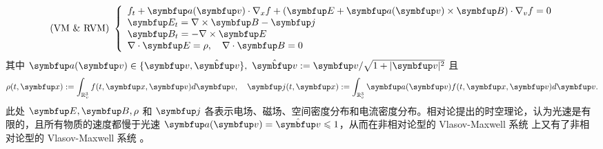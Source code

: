 \begin{equation}\label{eq:vm}\text { (VM \& RVM) }\left\{\begin{array}{l}
    f_{t}+\vect{a}(\vv) \cdot \nabla_{x} f+(\vE+\vect{a}(\vv) \times \vB) \cdot \nabla_{v} f=0 \\
    \vE_{t}=\nabla \times \vB-\vect{j} \\
    \vB_{t}=-\nabla \times \vE \\
    \nabla \cdot \vE=\rho, \quad \nabla \cdot \vB=0
    \end{array}\right.\end{equation}
其中 $\vect{a}(\vv) \in\{\vv, \hat{\vv}\},~ \hat{\vv}:=\vv / \sqrt{1+|\vv|^{2}}$ 且 
\begin{equation}
\rho(t, \vx):=\int_{\bbRv} \ftxv d \vect{v}, \quad \vect{j}(t, \vx):=\int_{\bbRv} \vect{a}(\vv)\ftxv d \vect{v}.
\end{equation}
此处 $\vE, \vB, \rho$ 和 $\vect{j}$ 各表示电场、磁场、空间密度分布和电流密度分布。相对论提出的时空理论，认为光速是有限的，且所有物质的速度都慢于光速 $\vect{a}(\vv)=\hat{\vv}\leqslant 1$，从而在非相对论型的 Vlasov-Maxwell 系统 \eqvm 上又有了非相对论型的 Vlasov-Maxwell 系统 \eqrvm。



